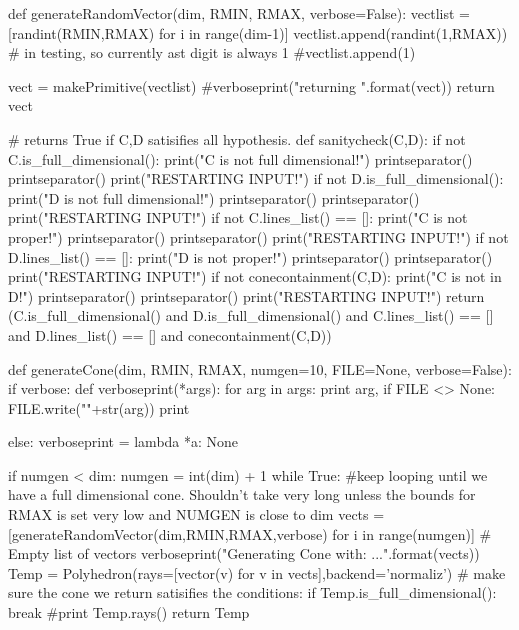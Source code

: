 \documentclass{TC}
\begin{document}
\begin{SAGE}
def generateRandomVector(dim, RMIN, RMAX, verbose=False):
    vectlist  = [randint(RMIN,RMAX) for i in range(dim-1)]
    vectlist.append(randint(1,RMAX))
    # in testing, so currently ast digit is always 1
    #vectlist.append(1)

    
    vect = makePrimitive(vectlist)
    #verboseprint("returning {}".format(vect))
    return vect
    

# returns True if C,D satisifies all hypothesis.
def sanitycheck(C,D):
    if not C.is_full_dimensional():
        print("C is not full dimensional!")
        printseparator()
        printseparator()
        print("RESTARTING INPUT!")
    if not D.is_full_dimensional():
        print("D is not full dimensional!")
        printseparator()
        printseparator()
        print("RESTARTING INPUT!")
    if not C.lines_list() == []:
        print("C is not proper!")
        printseparator()
        printseparator()
        print("RESTARTING INPUT!")
    if not D.lines_list() == []:
        print("D is not proper!")
        printseparator()
        printseparator()        
        print("RESTARTING INPUT!")
    if not conecontainment(C,D):
        print("C is not in D!")
        printseparator()
        printseparator()
        print("RESTARTING INPUT!")
    return (C.is_full_dimensional() and D.is_full_dimensional() and C.lines_list() == [] and D.lines_list() == [] and conecontainment(C,D))
        

def generateCone(dim, RMIN, RMAX, numgen=10, FILE=None, verbose=False):
    if verbose:
        def verboseprint(*args):
            for arg in args:
                print arg,
                if FILE <> None:
                    FILE.write("\n"+str(arg))
            print

    else:
        verboseprint = lambda *a: None 

    if numgen < dim: 
        numgen = int(dim) + 1
    while True: 
    #keep looping until we have a full dimensional cone. Shouldn't take very long unless the bounds for RMAX is set very low and NUMGEN is close to dim
        vects = [generateRandomVector(dim,RMIN,RMAX,verbose) for i in range(numgen)] # Empty list of vectors
        verboseprint("Generating Cone with: \n{}\n...\n".format(vects))
        Temp = Polyhedron(rays=[vector(v) for v in vects],backend='normaliz')
        # make sure the cone we return satisifies the conditions:
        if Temp.is_full_dimensional():
            break
        #print Temp.rays()
    return Temp





\end{SAGE}
\end{document}

